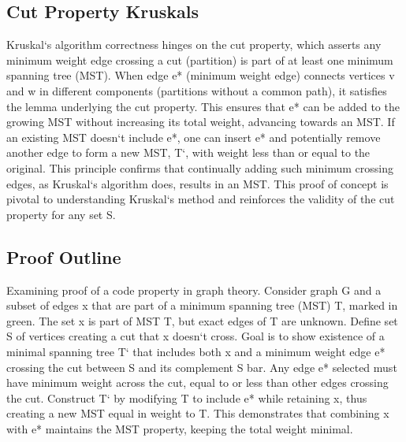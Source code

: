 \subsection*{Cut Property  Kruskals}
Kruskal`s algorithm correctness hinges on the cut property, which asserts any minimum weight edge crossing a cut (partition) is part of at least one minimum spanning tree (MST).
When edge e* (minimum weight edge) connects vertices v and w in different components (partitions without a common path), it satisfies the lemma underlying the cut property.
This ensures that e* can be added to the growing MST without increasing its total weight, advancing towards an MST\@.
If an existing MST doesn`t include e*, one can insert e* and potentially remove another edge to form a new MST, T`, with weight less than or equal to the original.
This principle confirms that continually adding such minimum crossing edges, as Kruskal`s algorithm does, results in an MST\@.
This proof of concept is pivotal to understanding Kruskal`s method and reinforces the validity of the cut property for any set S\@.

\subsection*{Proof Outline}
Examining proof of a code property in graph theory.
Consider graph G and a subset of edges x that are part of a minimum spanning tree (MST) T, marked in green.
The set x is part of MST T, but exact edges of T are unknown.
Define set S of vertices creating a cut that x doesn`t cross.
Goal is to show existence of a minimal spanning tree T` that includes both x and a minimum weight edge e* crossing the cut between S and its complement S bar.
Any edge e* selected must have minimum weight across the cut, equal to or less than other edges crossing the cut.
Construct T` by modifying T to include e* while retaining x, thus creating a new MST equal in weight to T\@.
This demonstrates that combining x with e* maintains the MST property, keeping the total weight minimal.

